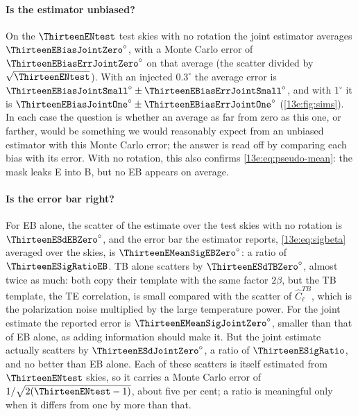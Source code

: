 \paragraph{Is the estimator unbiased?} On the $\ThirteenENtest$ test skies with no rotation the joint
estimator averages $\ThirteenEBiasJointZero^\circ$, with a Monte Carlo error of $\ThirteenEBiasErrJointZero^\circ$
on that average (the scatter divided by $\sqrt{\ThirteenENtest}$). With an injected $0.3^\circ$ the average
error is $\ThirteenEBiasJointSmall^\circ\pm\ThirteenEBiasErrJointSmall^\circ$, and with $1^\circ$ it is
$\ThirteenEBiasJointOne^\circ\pm\ThirteenEBiasErrJointOne^\circ$ (\cref{13e:fig:sims}). In each case the
question is whether an average as far from zero as this one, or farther, would be something we would
reasonably expect from an unbiased estimator with this Monte Carlo error; the answer is read off by
comparing each bias with its error. With no rotation, this also confirms \eqref{13e:eq:pseudo-mean}: the mask
leaks E into B, but no EB appears on average.

\paragraph{Is the error bar right?} For EB alone, the scatter of the estimate over the test skies with no
rotation is $\ThirteenESdEBZero^\circ$, and the error bar the estimator reports, \eqref{13e:eq:sigbeta}
averaged over the skies, is $\ThirteenEMeanSigEBZero^\circ$: a ratio of $\ThirteenESigRatioEB$. TB alone
scatters by $\ThirteenESdTBZero^\circ$, almost twice as much: both copy their template with the same
factor $2\beta$, but the TB template, the TE correlation, is small compared with the scatter of
$\widehat C^{TB}_\ell$, which is the polarization noise multiplied by the large temperature power. For the
joint estimate the reported error is $\ThirteenEMeanSigJointZero^\circ$, smaller than that of EB alone, as
adding information should make it. But the joint estimate actually scatters by $\ThirteenESdJointZero^\circ$,
a ratio of $\ThirteenESigRatio$, and no better than EB alone. Each of these scatters is itself estimated from
$\ThirteenENtest$ skies, so it carries a Monte Carlo error of $1/\sqrt{2(\ThirteenENtest-1)}$, about five per
cent; a ratio is meaningful only when it differs from one by more than that.

